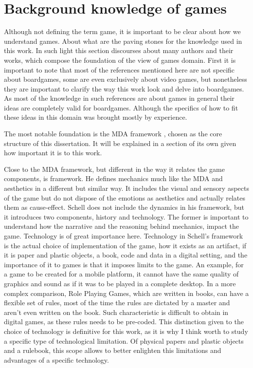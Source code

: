 \section{Background knowledge of games}

Although not defining the term game, it is important to be clear about how we understand games. About what are the paving stones for the knowledge used in this work. In such light this section discourses about many authors and their works, which compose the foundation of the view of games domain. First it is important to note that most of the references mentioned here are not specific about boardgames, some are even exclusively about video games, but nonetheless they are important to clarify the way this work look and delve into boardgames. As most of the knowledge in such references are about games in general their ideas are completely valid for boardgames. Although the specifics of how to fit these ideas in this domain was brought mostly by experience.

The most notable foundation is the MDA framework \cite{Hunicke2004}, chosen as the core structure of this dissertation. It will be explained in a section of its own given how important it is to this work.

Close to the MDA framework, but different in the way it relates the game components, is \cite{schell2014art} framework. He defines mechanics much like the MDA and aesthetics in a different but similar way. It includes the visual and sensory aspects of the game but do not dispose of the emotions as aesthetics and actually relates them as cause-effect. Schell does not include the dynamics in his framework, but it introduces two components, history and technology. The former is important to understand how the narrative and the reasoning behind mechanics, impact the game. Technology is of great importance here. Technology in Schell's framework is the actual choice of implementation of the game, how it exists as an artifact, if it is paper and plastic objects, a book, code and data in a digital setting, and the importance of it to games is that it imposes limits to the game. An example, for a game to be created for a mobile platform, it cannot have the same quality of graphics and sound as if it was to be played in a complete desktop. In a more complex comparison, Role Playing Games, which are written in books, can have a flexible set of rules, most of the time the rules are dictated by a master and aren't even written on the book. Such characteristic is difficult to obtain in digital games, as these rules needs to be pre-coded. This distinction given to the choice of technology is definitive for this work, as it is why I think worth to study a specific type of technological limitation. Of physical papers and plastic objects and a rulebook, this scope allows to better enlighten this limitations and advantages of a specific technology.

